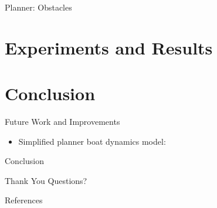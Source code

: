 \documentclass[10pt,xcolor={table,dvipsnames},t]{beamer}
\begin{document}
\begin{frame}{Planner: Obstacles}

\end{frame}

\section{Experiments and Results}

\section{Conclusion}

\begin{frame}{Future Work and Improvements}

\begin{itemize}
    \item Simplified planner boat dynamics model:
\end{itemize}
    
\end{frame}

\begin{frame}{Conclusion}
    
\end{frame}

\begin{frame}{Thank You}
    Questions?
\end{frame}


\begin{frame}{References}
    \printbibliography{}
\end{frame}
\end{document}
